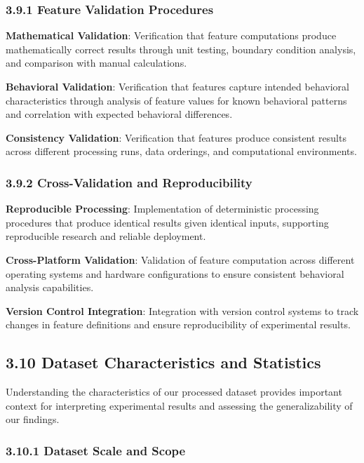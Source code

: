 \documentclass[
  11pt,
  a4paper,
]{article}
\begin{document}
\subsubsection{3.9.1 Feature Validation
Procedures}\label{feature-validation-procedures}

\textbf{Mathematical Validation}: Verification that feature computations
produce mathematically correct results through unit testing, boundary
condition analysis, and comparison with manual calculations.

\textbf{Behavioral Validation}: Verification that features capture
intended behavioral characteristics through analysis of feature values
for known behavioral patterns and correlation with expected behavioral
differences.

\textbf{Consistency Validation}: Verification that features produce
consistent results across different processing runs, data orderings, and
computational environments.

\subsubsection{3.9.2 Cross-Validation and
Reproducibility}\label{cross-validation-and-reproducibility}

\textbf{Reproducible Processing}: Implementation of deterministic
processing procedures that produce identical results given identical
inputs, supporting reproducible research and reliable deployment.

\textbf{Cross-Platform Validation}: Validation of feature computation
across different operating systems and hardware configurations to ensure
consistent behavioral analysis capabilities.

\textbf{Version Control Integration}: Integration with version control
systems to track changes in feature definitions and ensure
reproducibility of experimental results.

\subsection{3.10 Dataset Characteristics and
Statistics}\label{dataset-characteristics-and-statistics}

Understanding the characteristics of our processed dataset provides
important context for interpreting experimental results and assessing
the generalizability of our findings.

\subsubsection{3.10.1 Dataset Scale and
Scope}\label{dataset-scale-and-scope}
\end{document}
